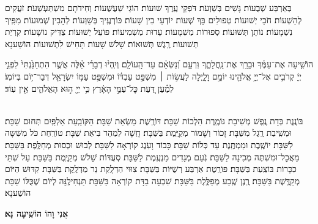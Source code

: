 \documentclass[twoside, openany, parskip=half, 11pt]{book}
\begin{document}

בְּאַרְבַּע שְׁבֻעוֹת׃ גָּשִׁים בְּשַׁוְעֹת׃ דֹּפְקֵי עֶֽרֶךְ שׁוּעוֹת׃ הוֹגֵי שַׁעֲשֻׁעוֹת׃ וְחִידֹתָם מִשְׁתַּעְשְׁעֹת׃ זֹעֲקִים לְהַשְׁעוֹת׃ חֹכֵי יְשׁוּעוֹת׃ טְפוּלִים בָּךְ שְׁעוֹת׃ יוֹדְעֵי בִין שָׁעוֹת׃ כּוֹרְעֶֽיךָ בְּשַׁוְּעוֹת׃ לְהָבִין שְׁמוּעוֹת׃ מִפִּֽיךָ נִשְׁמָעוֹת׃ נוֹתֵן תְּשׁוּעוֹת׃ סְפוּרוֹת מַשְׁמָעוֹת׃ עֵדוּת מַשְׁמִיעוֹת׃ פּוֹעֵל יְשׁוּעוֹת׃ צַדִּיק נוֹשָׁעוֹת׃ קִרְיַת תְּשׁוּעוֹת׃ רֶֽגֶשׁ תְּשׁוּאוֹת׃
שָׁלֹשׁ שָׁעוֹת׃
תָּחִישׁ לִתְשׁוּעוֹת הוֹשַׁענָא


\label{aniveho}

\aniveho

\newcommand{\hoshia}{
	הוֹשִׁ֤יעָה \source{תהלים כח}אֶת־עַמֶּ֗ךָ וּבָרֵ֥ךְ אֶת־נַֽחֲלָתֶ֑ךָ וּֽרְעֵ֥ם וְ֝נַשְּׂאֵ֗ם עַד־הָֽעוֹלָֽם׃ \source{מל״א ח}וְיִֽהְי֨וּ דְבָרַ֜י אֵ֗לֶּה אֲשֶׁ֤ר הִתְחַנַּ֙נְתִּי֙ לִפְנֵ֣י יְיָ֔ קְרֹבִ֛ים אֶל־יְיָ֥ אֱלֹהֵ֖ינוּ יוֹמָ֣ם וָלָ֑יְלָה לַעֲשׂ֣וֹת ׀ מִשְׁפַּ֣ט עַבְדּ֗וֹ וּמִשְׁפַּ֛ט עַמּ֥וֹ יִשְׂרָאֵ֖ל דְּבַר־י֥וֹם בְּיוֹמֽוֹ׃ לְמַ֗עַן דַּ֚עַת כׇּל־עַמֵּ֣י הָאָ֔רֶץ כִּ֥י יְיָ֖ ה֣וּא הָאֱלֹהִ֑ים אֵ֖ין עֽוֹד׃
}

\hoshia


\sepline

\label{hoshanotshabbat}
\\
בּוֹנֶֽנֶת בְּדָת נֶֽפֶשׁ מְשִׁיבַת׃ גּוֹמֶֽרֶת הִלְכוֹת שַׁבָּת׃ דּוֹרֶֽשֶׁת מַשְׂאַת שַׁבָּת׃ הַקּוֹבַֽעַת אַלְפַּֽיִם תְּחוּם שַׁבָּת׃ וּמְשִֽׁיבַת רֶֽגֶל מִשַּׁבָּת׃ זָכוֹר וְשָׁמוֹר מְקַיֶּֽמֶת בַּשַּׁבָּת׃ חָֽשָׁה לְמַהֵר בִּיאַת שַׁבָּת׃ טוֹרַֽחַת כֹּל מִשִּׁשָּה לַשַּׁבָּת׃ יוֹשֶֽׁבֶת וּמַמְתֶּֽנֶת עַד כְּלוֹת שַׁבָּת׃ כָּבוֹד וָעֹֽנֶג קוֹרְאָה לַשַּׁבָּת׃ לְבוּשׁ וּכְסוּת מְחַלֶּֽפֶת בַּשַּׁבָּת׃ מַאֲכׇל־וּמִשְׁתֶּה מְכִינָה לַשַּׁבָּת׃ נֹֽעַם מְגָדִים מַנְעֶֽמֶת לַשַּׁבָּת׃ סְעֻדּוֹת שָׁלֹשׁ מְקַיֶּֽמֶת בַּשַּׁבָּת׃ עַל שְׁתֵּי כִכָּרוֹת בּוֹצַֽעַת בַּשַּׁבָּת׃ פּוֹרֶֽטֶת אַרְבַּע רְשֻׁיּוֹת בַּשַּׁבָּת׃ צִוּוּי הַדְלָֽקַת נֵר מַדְלֶֽקֶת בַּשַּׁבָּת׃ קִדּוּשׁ הַיּוֹם מְקַדֶּֽשֶׁת בַּשַּׁבָּת׃ רֶֽנֶן שֶֽׁבַע מְפַלֶּֽלֶת בַּשַּׁבָּת׃ שִׁבְעָה בַדָּת קוֹרְאָה בַּשַּׁבָּת׃ תַּנְחִילֶֽנָּה לְיוֹם שֶׁכֻּלּוֹ שַׁבָּת הוֹשַׁענָא׃

\begin{large}
	\textbf{אֲנִי וָהוֹ הוֹשִֽׁיעָה נָּא׃}
\end{large}
\end{document}
